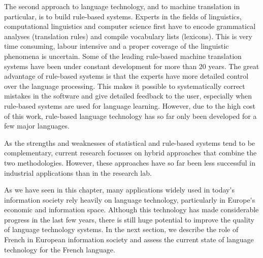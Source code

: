 \begin{multicols}{2}
The second approach to language technology, and to machine translation in particular, is to build rule-based systems. Experts in the fields of linguistics, computational linguistics and computer science first have to encode grammatical analyses (translation rules) and compile vocabulary lists (lexicons). This is very time consuming, labour intensive and a proper coverage of the linguistic phenomena is uncertain. Some of the leading rule-based machine translation systems have been under constant development for more than 20 years. The great advantage of rule-based systems is that the experts have more detailed control over the language processing. This makes it possible to systematically correct mistakes in the software and give detailed feedback to the user, especially when rule-based systems are used for language learning. However, due to the high cost of this work, rule-based language technology has so far only been developed for a few major languages. 


As the strengths and weaknesses of statistical and rule-based systems tend to be complementary, current research focusses on hybrid approaches that combine the two methodologies. However, these approaches have so far been less successful in industrial applications than in the research lab. 

As we have seen in this chapter, many applications widely used in
today{\mbox '}s information society rely heavily on language technology,
particularly in Europe{\mbox '}s economic and information space. Although this
technology has made considerable progress in the last few years, there
is still huge potential to improve the quality of language technology
systems. In the next section, we describe the role of French in
European information society and assess the current state of language
technology for the French language.
\end{multicols}

\clearpage


